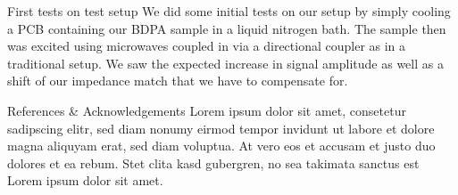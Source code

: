 \documentclass[final]{beamer}
\begin{document}
\begin{frame}[fragile]{}
\begin{columns}[T]
\begin{column}{.49\linewidth}
      \begin{block}{\large First tests on test setup}
        We did some initial tests on our setup by simply cooling a PCB containing our
        BDPA sample in a liquid nitrogen bath. The sample then was excited using microwaves
        coupled in via a directional coupler as in a traditional setup. We saw the
        expected increase in signal amplitude as well as a shift of our impedance match
        that we have to compensate for.
      \end{block}

      \begin{block}{\large References \& Acknowledgements}
        Lorem ipsum dolor sit amet, consetetur sadipscing elitr, sed diam nonumy
        eirmod tempor invidunt ut labore et dolore magna aliquyam erat, sed diam
        voluptua. At vero eos et accusam et justo duo dolores et ea rebum. Stet
        clita kasd gubergren, no sea takimata sanctus est Lorem ipsum dolor sit
        amet.
      \end{block}

    \end{column}

  \end{columns}

\end{frame}
\end{document}
